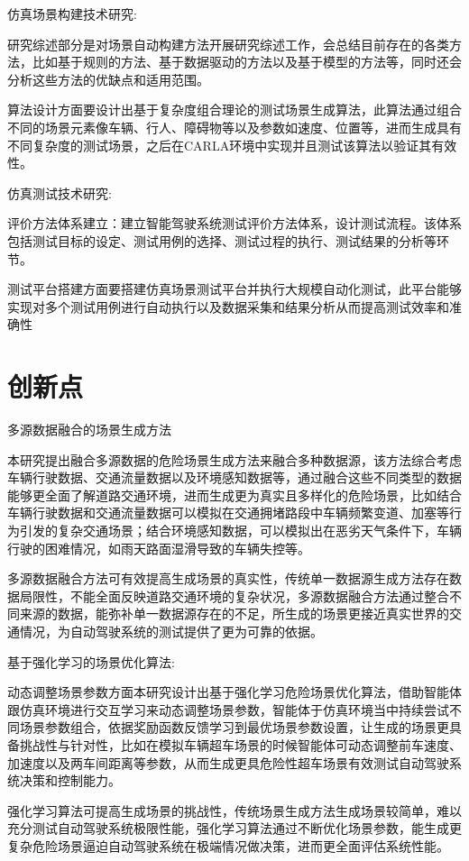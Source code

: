 仿真场景构建技术研究:

研究综述部分是对场景自动构建方法开展研究综述工作，会总结目前存在的各类方法，比如基于规则的方法、基于数据驱动的方法以及基于模型的方法等，同时还会分析这些方法的优缺点和适用范围。

算法设计方面要设计出基于复杂度组合理论的测试场景生成算法，此算法通过组合不同的场景元素像车辆、行人、障碍物等以及参数如速度、位置等，进而生成具有不同复杂度的测试场景，之后在CARLA环境中实现并且测试该算法以验证其有效性。

仿真测试技术研究:

评价方法体系建立：建立智能驾驶系统测试评价方法体系，设计测试流程。该体系包括测试目标的设定、测试用例的选择、测试过程的执行、测试结果的分析等环节。

测试平台搭建方面要搭建仿真场景测试平台并执行大规模自动化测试，此平台能够实现对多个测试用例进行自动执行以及数据采集和结果分析从而提高测试效率和准确性



\section{创新点}

多源数据融合的场景生成方法

本研究提出融合多源数据的危险场景生成方法来融合多种数据源，该方法综合考虑车辆行驶数据、交通流量数据以及环境感知数据等，通过融合这些不同类型的数据能够更全面了解道路交通环境，进而生成更为真实且多样化的危险场景，比如结合车辆行驶数据和交通流量数据可以模拟在交通拥堵路段中车辆频繁变道、加塞等行为引发的复杂交通场景；结合环境感知数据，可以模拟出在恶劣天气条件下，车辆行驶的困难情况，如雨天路面湿滑导致的车辆失控等\cite{zhang2014multi}。

多源数据融合方法可有效提高生成场景的真实性，传统单一数据源生成方法存在数据局限性，不能全面反映道路交通环境的复杂状况，多源数据融合方法通过整合不同来源的数据，能弥补单一数据源存在的不足，所生成的场景更接近真实世界的交通情况，为自动驾驶系统的测试提供了更为可靠的依据。

基于强化学习的场景优化算法:

动态调整场景参数方面本研究设计出基于强化学习危险场景优化算法，借助智能体跟仿真环境进行交互学习来动态调整场景参数，智能体于仿真环境当中持续尝试不同场景参数组合，依据奖励函数反馈学习到最优场景参数设置，让生成的场景更具备挑战性与针对性，比如在模拟车辆超车场景的时候智能体可动态调整前车速度、加速度以及两车间距离等参数，从而生成更具危险性超车场景有效测试自动驾驶系统决策和控制能力。

强化学习算法可提高生成场景的挑战性，传统场景生成方法生成场景较简单，难以充分测试自动驾驶系统极限性能，强化学习算法通过不断优化场景参数，能生成更复杂危险场景逼迫自动驾驶系统在极端情况做决策，进而更全面评估系统性能。

